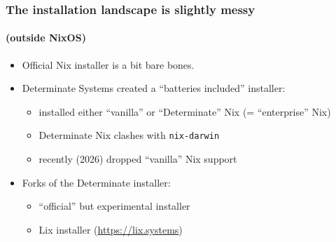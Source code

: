 \documentclass[nochapters]{otagoslides}
\begin{document}
\begin{frame}
    \frametitle{The installation landscape is slightly messy}
    \framesubtitle{(outside NixOS)}

    \begin{itemize}
        \item Official Nix installer is a bit bare bones.
        \item Determinate Systems created a ``batteries included'' installer:
        \begin{itemize}
            \item installed either ``vanilla'' or ``Determinate'' Nix {\tiny (= ``enterprise'' Nix)}
            \item Determinate Nix clashes with \texttt{nix-darwin}
            \item recently (2026) dropped ``vanilla'' Nix support
        \end{itemize}
        \item Forks of the Determinate installer:
        \begin{itemize}
            \item ``official'' but experimental installer
            \item Lix installer {\tiny (\url{https://lix.systems})}
        \end{itemize}
    \end{itemize}
\end{frame}


\end{document}
